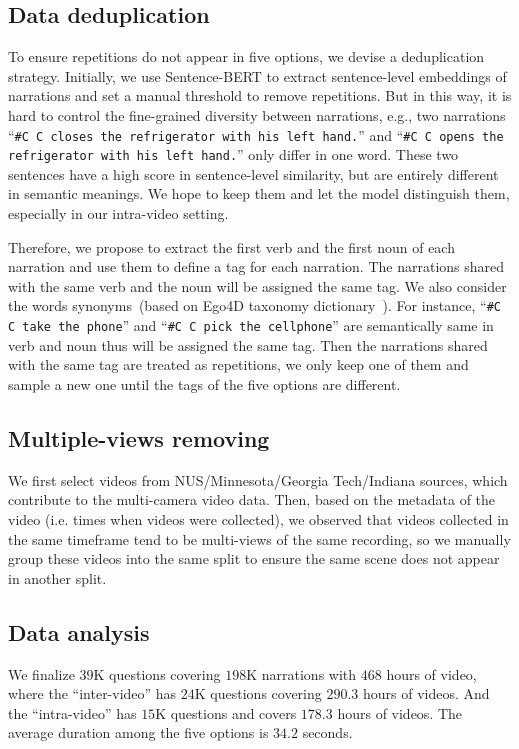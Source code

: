 \documentclass{article}
\begin{document}
\subsection{Data deduplication}\label{b1}
To ensure repetitions do not appear in five options, we devise a deduplication strategy.
Initially, we use Sentence-BERT to extract sentence-level embeddings of narrations and set a manual threshold to remove repetitions.
But in this way, it is hard to control the fine-grained diversity between narrations, e.g., two narrations 
``\texttt{\#C C closes the refrigerator with his left hand.}'' and ``\texttt{\#C C opens the refrigerator with his left hand.}'' only differ in one word. These two sentences have a high score in sentence-level similarity, but are entirely different in semantic meanings. We hope to keep them and let the model distinguish them, especially in our intra-video setting.

Therefore, we propose to extract \textcolor{citecolor1}{the first verb} and \textcolor{citecolor2}{the first noun} of each narration and use them to define a tag for each narration.
The narrations shared with the same verb and the noun will be assigned the same tag. 
We also consider the words synonyms~(based on Ego4D taxonomy dictionary~\cite{grauman2021ego4d}).
For instance, ``\texttt{\#C C \textcolor{citecolor1}{take} the \textcolor{citecolor2}{phone}}'' and ``\texttt{\#C C \textcolor{citecolor1}{pick} the \textcolor{citecolor2}{cellphone}}'' are semantically same in verb and noun thus will be assigned the same tag. 
Then the narrations shared with the same tag are treated as repetitions, we only keep one of them and sample a new one until the tags of the five options are different.

\subsection{Multiple-views removing}\label{b3}
We first select videos from NUS/Minnesota/Georgia Tech/Indiana sources, which contribute to the multi-camera video data. Then, based on the metadata of the video (i.e. times when videos were collected), we observed that videos collected in the same timeframe tend to be multi-views of the same recording, so we manually group these videos into the same split to ensure the same scene does not appear in another split.

\subsection{Data analysis}\label{b2}
We finalize $39$K questions covering $198$K narrations with $468$ hours of video, where the ``inter-video'' has $24$K questions covering $290.3$ hours of videos. And the ``intra-video'' has $15$K questions and covers $178.3$ hours of videos. The average duration among the five options is $34.2$ seconds.
\end{document}
